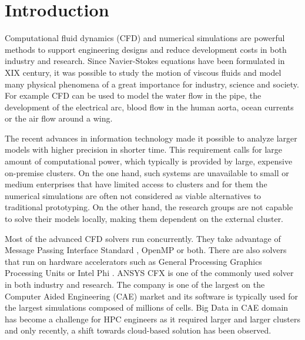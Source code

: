 \documentclass[3p,times]{elsarticle}
\begin{document}

\section{Introduction} 
\label{sec:introduction}

Computational fluid dynamics (CFD) and numerical simulations are powerful methods to support engineering designs and reduce development costs in both industry and research. Since Navier-Stokes equations have been formulated in XIX century, it was possible to study the motion of viscous fluids and  model many physical phenomena of a great importance for industry, science and society. For example CFD can be used to model the water flow in the pipe, the development of the electrical arc, blood flow in the human aorta, ocean currents or the air flow around a wing. 

The recent advances in information technology made it possible to analyze larger models with higher precision in shorter time. This requirement calls for large amount of computational power, which typically is provided by large, expensive on-premise clusters. On the one hand, such systems are unavailable to small or medium enterprises that have limited access to clusters and for them the numerical simulations are often not considered as viable alternatives to traditional prototyping. On the other hand, the research groups are not capable to solve their models locally, making them dependent on the external cluster.

Most of the advanced CFD solvers run concurrently. They take advantage of Message Passing Interface Standard \cite{openfoam}, OpenMP or both. There are also solvers that run on hardware accelerators such as General Processing Graphics Processing Units \cite{tomczak2013} or Intel Phi \cite{Che09042015}. ANSYS CFX is one of the commonly used solver in both industry and research. The company is one of the largest on the Computer Aided Engineering (CAE) market \cite{mcae2012} and its software is typically used for the largest simulations composed of millions of cells. Big Data in CAE domain has become a challenge for HPC engineers as it required larger and larger clusters and only recently, a shift towards cloud-based solution has been observed.
\end{document}
